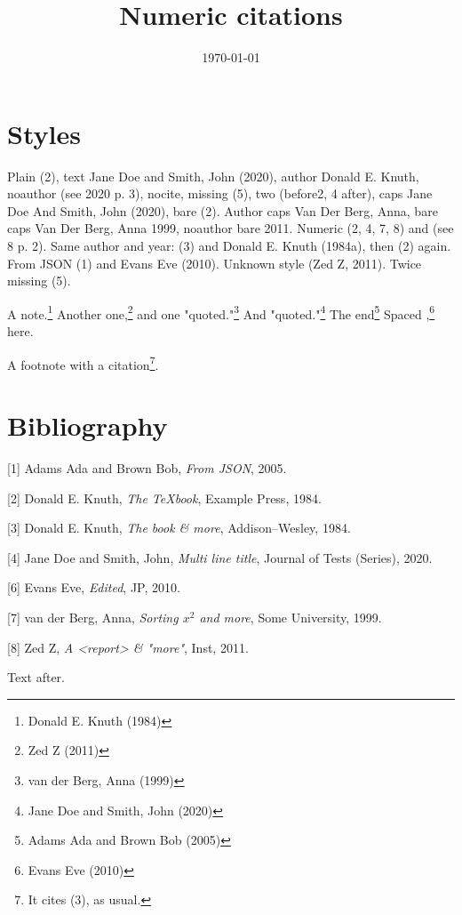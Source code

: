 \documentclass[11pt]{article}
\date{\today}
\title{Numeric citations}
\begin{document}
\maketitle
\tableofcontents

\section{Styles}
\label{sec:org3028fdc}
Plain (2), text Jane Doe and Smith, John (2020), author Donald E. Knuth,
noauthor (see 2020 p. 3), nocite, missing (5),
two (before2, 4 after), caps Jane Doe And Smith, John (2020), bare (2).
Author caps Van Der Berg, Anna, bare caps Van Der Berg, Anna 1999, noauthor bare 2011.
Numeric (2, 4, 7, 8) and (see 8 p. 2).
Same author and year: (3) and Donald E. Knuth (1984a), then (2) again.
From JSON (1) and Evans Eve (2010).
Unknown style (Zed Z, 2011).  Twice missing (5).

A note.\footnote{Donald E. Knuth (1984)} Another one,\footnote{Zed Z (2011)} and one "quoted."\footnote{van der Berg, Anna (1999)}
And "quoted."\footnote{Jane Doe and Smith, John (2020)} The end\footnote{Adams Ada and Brown Bob (2005)}
Spaced ,\footnote{Evans Eve (2010)}  here.

A footnote with a citation\footnote{It cites (3), as usual.}.
\section{Bibliography}
\label{sec:org0af2b60}
\noindent
{[}1] Adams Ada and Brown Bob, \emph{From JSON}, 2005.

\noindent
{[}2] Donald E. Knuth, \emph{The {\TeX}book}, Example Press, 1984.

\noindent
{[}3] Donald E. Knuth, \emph{The \METAFONT book \& more}, Addison--Wesley, 1984.

\noindent
{[}4] Jane Doe and Smith, John, \emph{Multi line title}, Journal of Tests (Series), 2020.

\noindent
{[}6] Evans Eve, \emph{Edited}, JP, 2010.

\noindent
{[}7] van der Berg, Anna, \emph{Sorting $x^2$ and \alpha{} more}, Some University, 1999.

\noindent
{[}8] Zed Z, \emph{A <report> & "more"}, Inst, 2011.

Text after.
\end{document}
